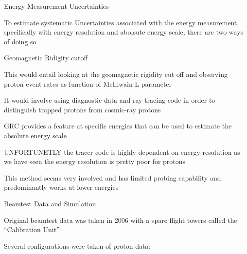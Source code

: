 \documentclass{article}
\begin{document}
\begin{myEnumerate}
\begin{myEnumerate}
\begin{myEnumerate}
\begin{myEnumerate}
				\end{myEnumerate}
			\end{myEnumerate}
			\item Energy Measurement Uncertainties
			\begin{myEnumerate}
				\item To estimate systematic Uncertainties associated with the energy measurement, specifically with energy resolution and abolsute energy scale, there are two ways of doing so
				\item Geomagnetic Ridigity cutoff
				\begin{myEnumerate}
					\item This would entail looking at the geomagnetic rigidity cut off and observing proton event rates as function of McIllwain L parameter
					\item It would involve using diagnostic data and ray tracing code in order to distinguish trapped protons from cosmic-ray protons
					\item GRC provides a feature at specific energies that can be used to estimate the absolute energy scale
					\item UNFORTUNETLY the tracer code is highly dependent on energy resolution as we have seen the energy resolution is pretty poor for protons
					\item This method seems very involved and has limited probing capability and predominantly works at lower energies
				\end{myEnumerate}
				\item Beamtest Data and Simulation
				\begin{myEnumerate}
					\item Original beamtest data was taken in 2006 with a spare flight towers called the ``Calibration Unit''
					\item Several configurations were taken of proton data:


\end{myEnumerate}
\end{myEnumerate}
\end{myEnumerate}
\end{myEnumerate}
\end{document}
